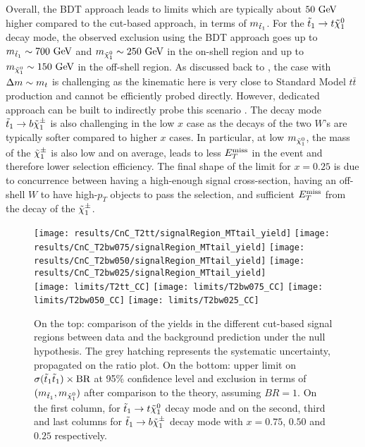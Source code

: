     Overall, the BDT approach leads to limits which are typically about $50~\text{GeV}$ higher
    compared to the cut-based approach, in terms of $m_{\tilde{t}_1}$. For the $\tilde{t}_1
    \rightarrow t \tilde{\chi}_1^0$ decay mode, the observed exclusion using the BDT approach
    goes up to $m_{\tilde{t}_1} \sim 700~\text{GeV}$ and $m_{\tilde{\chi}_1^0} \sim 250~\text{GeV}$ in the
    on-shell region and up to $m_{\tilde{\chi}_1^0} \sim 150~\text{GeV}$ in the off-shell region.
    As discussed back to , the case with $\Delta m \sim
    m_{t}$ is challenging as the kinematic here is very close to Standard Model $t\bar{t}$
    production and cannot be efficiently probed directly. However, dedicated approach can
    be built to indirectly probe this scenario \cite{SUS-13-021, ClosingStopGap}. The
    decay mode $\tilde{t}_1 \rightarrow b \tilde{\chi}_1^\pm$ is also challenging in the low $x$ case
    as the decays of the two $W$'s are typically softer compared to higher $x$ cases. In
    particular, at low $m_{\tilde{\chi}_1^0}$, the mass of the $\tilde{\chi}_1^\pm$ is also low and
    on average, leads to less $E_T^\text{miss}$ in the event and therefore lower selection efficiency. The final shape
    of the limit for $x = 0.25$ is due to concurrence between having a high-enough signal cross-section,
    having an off-shell $W$ to have high-$p_T$ objects to pass the selection, and
    sufficient $E_T^\text{miss}$ from the decay of the $\tilde{\chi}_1^\pm$.

    \begin{landscape}
        \thispagestyle{empty}
        \vspace*{1cm}
    \begin{figure}[h!]
        \centering
        \texttt{[image: results/CnC\_T2tt/signalRegion\_MTtail\_yield]}
        \texttt{[image: results/CnC\_T2bw075/signalRegion\_MTtail\_yield]}
        \texttt{[image: results/CnC\_T2bw050/signalRegion\_MTtail\_yield]}
        \texttt{[image: results/CnC\_T2bw025/signalRegion\_MTtail\_yield]}\\
        \texttt{[image: limits/T2tt\_CC]}
        \texttt{[image: limits/T2bw075\_CC]}
        \texttt{[image: limits/T2bw050\_CC]}
        \texttt{[image: limits/T2bw025\_CC]}
        \caption{On the top: comparison of the yields in the different cut-based signal
        regions between data and the background prediction under the null hypothesis. The
        grey hatching represents the systematic uncertainty, propagated on the ratio plot.
        On the bottom: upper limit on $\sigma(\tilde{t}_1\tilde{t}_1) \times \text{BR}$ at 95\% confidence level and exclusion in terms of
        $(m_{\tilde{t}_1},m_{\tilde{\chi}_1^0})$ after comparison to the theory, assuming
        $BR = 1$. On the first column, for $\tilde{t}_1 \rightarrow t \tilde{\chi}_1^0$ decay mode and on
        the second, third and last columns for $\tilde{t}_1 \rightarrow b \tilde{\chi}_1^\pm$ decay mode
        with $x=0.75$, $0.50$ and $0.25$ respectively.}
        \label{fig:resultsCnC}
    \end{figure}
    \end{landscape}

